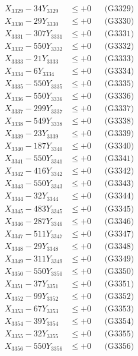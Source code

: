 \documentclass[a4paper,10pt]{article}
\begin{document}
{\begin{align}
X_{3329} - 34Y_{3329} &\leq +0 && \text{(G3329)} \\
X_{3330} - 29Y_{3330} &\leq +0 && \text{(G3330)} \\
\allowbreak
X_{3331} - 307Y_{3331} &\leq +0 && \text{(G3331)} \\
X_{3332} - 550Y_{3332} &\leq +0 && \text{(G3332)} \\
X_{3333} - 21Y_{3333} &\leq +0 && \text{(G3333)} \\
X_{3334} - 6Y_{3334} &\leq +0 && \text{(G3334)} \\
X_{3335} - 550Y_{3335} &\leq +0 && \text{(G3335)} \\
X_{3336} - 550Y_{3336} &\leq +0 && \text{(G3336)} \\
X_{3337} - 299Y_{3337} &\leq +0 && \text{(G3337)} \\
X_{3338} - 549Y_{3338} &\leq +0 && \text{(G3338)} \\
X_{3339} - 23Y_{3339} &\leq +0 && \text{(G3339)} \\
X_{3340} - 187Y_{3340} &\leq +0 && \text{(G3340)} \\
\allowbreak
X_{3341} - 550Y_{3341} &\leq +0 && \text{(G3341)} \\
X_{3342} - 416Y_{3342} &\leq +0 && \text{(G3342)} \\
X_{3343} - 550Y_{3343} &\leq +0 && \text{(G3343)} \\
X_{3344} - 32Y_{3344} &\leq +0 && \text{(G3344)} \\
X_{3345} - 483Y_{3345} &\leq +0 && \text{(G3345)} \\
X_{3346} - 287Y_{3346} &\leq +0 && \text{(G3346)} \\
X_{3347} - 511Y_{3347} &\leq +0 && \text{(G3347)} \\
X_{3348} - 29Y_{3348} &\leq +0 && \text{(G3348)} \\
X_{3349} - 311Y_{3349} &\leq +0 && \text{(G3349)} \\
X_{3350} - 550Y_{3350} &\leq +0 && \text{(G3350)} \\
\allowbreak
X_{3351} - 37Y_{3351} &\leq +0 && \text{(G3351)} \\
X_{3352} - 99Y_{3352} &\leq +0 && \text{(G3352)} \\
X_{3353} - 67Y_{3353} &\leq +0 && \text{(G3353)} \\
X_{3354} - 39Y_{3354} &\leq +0 && \text{(G3354)} \\
X_{3355} - 32Y_{3355} &\leq +0 && \text{(G3355)} \\
X_{3356} - 550Y_{3356} &\leq +0 && \text{(G3356)} \\

\end{align}}
\end{document}
